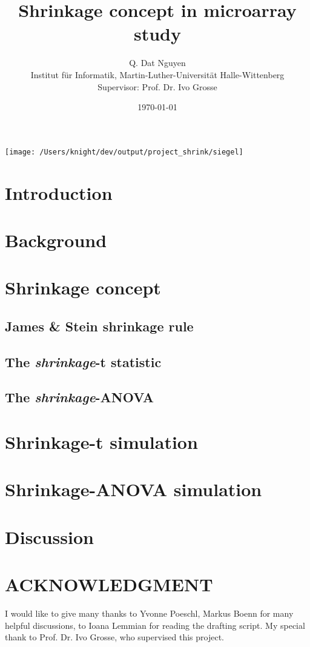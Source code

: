\documentclass[a4paper, 12pt]{scrartcl}
\title{Shrinkage concept in microarray study}
\author{Q. Dat Nguyen \\\small{Institut f\"ur Informatik, Martin-Luther-Universit\"at Halle-Wittenberg}\\\small{Supervisor: Prof. Dr. Ivo Grosse}}
\date{\today}
\begin{document}
	\maketitle
	\begin{center}
		\texttt{[image: /Users/knight/dev/output/project\_shrink/siegel]}
	\end{center}
	\thispagestyle{empty}
	\newpage
	\tableofcontents
	\newpage
\section{Introduction}
	
\section{Background}
	
\section{Shrinkage concept}
	\subsection{James \& Stein shrinkage rule}
		
	\subsection{The \emph{shrinkage}-t statistic}
		
	\subsection{The \emph{shrinkage}-ANOVA}
		
\section{Shrinkage-t simulation}
	
\section{Shrinkage-ANOVA simulation}
	
\section{Discussion}
	
\section*{ACKNOWLEDGMENT}
I would like to give many thanks to Yvonne Poeschl, Markus Boenn for many helpful discussions, to Ioana Lemmian for reading the drafting script. My special thank to Prof. Dr. Ivo Grosse, who supervised this project.
\newpage
\appendix
	\newpage
		
\newpage
\nocite{*}

\end{document}
